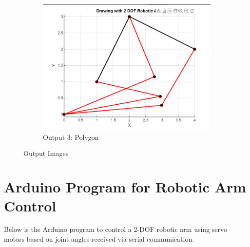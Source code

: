 \documentclass{article}
\begin{document}
\begin{figure}[]
    \begin{subfigure}[b]{0.8\textwidth}
        \centering
        \includegraphics[width=\textwidth]{imag_3.png}
        \caption{Output 3: Polygon}
        \label{fig:output-polygon}
    \end{subfigure}
    \caption{Output Images}
    \label{fig:output-images}
\end{figure}






\section{Arduino Program for Robotic Arm Control}

Below is the Arduino program to control a 2-DOF robotic arm using servo motors based on joint angles received via serial communication.
\end{document}
